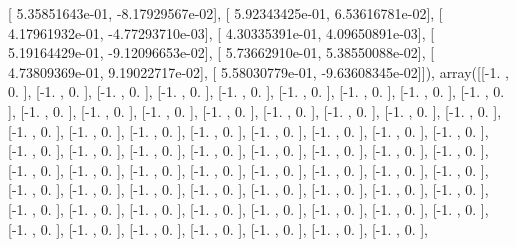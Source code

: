 \documentclass{article}
\begin{document}
       [  5.35851643e-01,  -8.17929567e-02],
       [  5.92343425e-01,   6.53616781e-02],
       [  4.17961932e-01,  -4.77293710e-03],
       [  4.30335391e-01,   4.09650891e-03],
       [  5.19164429e-01,  -9.12096653e-02],
       [  5.73662910e-01,   5.38550088e-02],
       [  4.73809369e-01,   9.19022717e-02],
       [  5.58030779e-01,  -9.63608345e-02]]), array([[-1.        ,  0.        ],
       [-1.        ,  0.        ],
       [-1.        ,  0.        ],
       [-1.        ,  0.        ],
       [-1.        ,  0.        ],
       [-1.        ,  0.        ],
       [-1.        ,  0.        ],
       [-1.        ,  0.        ],
       [-1.        ,  0.        ],
       [-1.        ,  0.        ],
       [-1.        ,  0.        ],
       [-1.        ,  0.        ],
       [-1.        ,  0.        ],
       [-1.        ,  0.        ],
       [-1.        ,  0.        ],
       [-1.        ,  0.        ],
       [-1.        ,  0.        ],
       [-1.        ,  0.        ],
       [-1.        ,  0.        ],
       [-1.        ,  0.        ],
       [-1.        ,  0.        ],
       [-1.        ,  0.        ],
       [-1.        ,  0.        ],
       [-1.        ,  0.        ],
       [-1.        ,  0.        ],
       [-1.        ,  0.        ],
       [-1.        ,  0.        ],
       [-1.        ,  0.        ],
       [-1.        ,  0.        ],
       [-1.        ,  0.        ],
       [-1.        ,  0.        ],
       [-1.        ,  0.        ],
       [-1.        ,  0.        ],
       [-1.        ,  0.        ],
       [-1.        ,  0.        ],
       [-1.        ,  0.        ],
       [-1.        ,  0.        ],
       [-1.        ,  0.        ],
       [-1.        ,  0.        ],
       [-1.        ,  0.        ],
       [-1.        ,  0.        ],
       [-1.        ,  0.        ],
       [-1.        ,  0.        ],
       [-1.        ,  0.        ],
       [-1.        ,  0.        ],
       [-1.        ,  0.        ],
       [-1.        ,  0.        ],
       [-1.        ,  0.        ],
       [-1.        ,  0.        ],
       [-1.        ,  0.        ],
       [-1.        ,  0.        ],
       [-1.        ,  0.        ],
       [-1.        ,  0.        ],
       [-1.        ,  0.        ],
       [-1.        ,  0.        ],
       [-1.        ,  0.        ],
       [-1.        ,  0.        ],
       [-1.        ,  0.        ],
       [-1.        ,  0.        ],
       [-1.        ,  0.        ],
       [-1.        ,  0.        ],
       [-1.        ,  0.        ],
       [-1.        ,  0.        ],
       [-1.        ,  0.        ],
\end{document}
